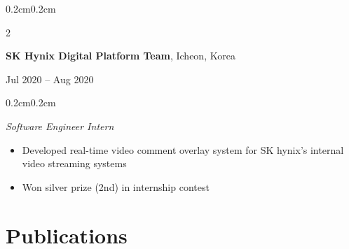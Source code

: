\documentclass[10pt, letterpaper]{article}
\newenvironment{highlights}[1][]{
    \begin{itemize}[
        topsep=0.10cm,
        parsep=0.10cm,
        partopsep=0pt,
        itemsep=0pt,
        leftmargin=0.4cm+10pt,
        #1
    ]
}{
    \end{itemize}
}
\newenvironment{onecolentry}{
    \begin{adjustwidth}{0.2cm}{0.2cm}
}{
    \end{adjustwidth}
}
\newenvironment{twocolentry}[2][]{
    \onecolentry
    \def\secondColumn{#2}
    \setcolumnwidth{\fill, 4.5cm}
    \begin{paracol}{2}
}{
    \switchcolumn \raggedleft \secondColumn
    \end{paracol}
    \endonecolentry
}
\begin{document}
\vspace{2mm}


\begin{twocolentry}{Jul 2020 -- Aug 2020}
\textbf{SK Hynix Digital Platform Team}, Icheon, Korea
\end{twocolentry}
\begin{onecolentry}
\textit{Software Engineer Intern}
\begin{highlights}
    \item Developed real-time video comment overlay system for SK hynix's internal video streaming systems
    \item Won silver prize (2nd) in internship contest
\end{highlights}
\end{onecolentry}

\section*{Publications}

\newcommand{\myname}[1]{\textbf{#1}}
\end{document}
